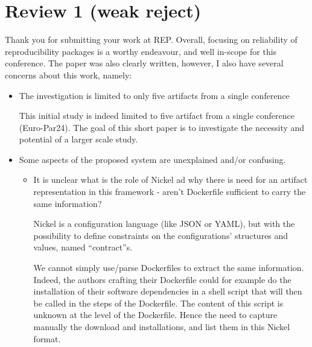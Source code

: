 \documentclass[%
	11pt,
	final,
]{article}
\begin{document}

\section{Review 1 (weak reject)}

Thank you for submitting your work at REP. Overall, focusing on reliability of reproducibility packages is a worthy endeavour, and well in-scope for this conference. The paper was also clearly written, however, I also have several concerns about this work, namely:


\begin{itemize}
\item The investigation is limited to only five artifacts from a single conference

\begin{review-answer}
  This initial study is indeed limited to five artifact from a single conference (Euro-Par24).
  The goal of this short paper is to investigate the necessity and potential of a larger scale study.
\end{review-answer}

\item Some aspects of the proposed system are unexplained and/or confusing.
  \begin{itemize}
   \item It is unclear what is the role of Nickel ad why there is need for an artifact representation in this framework - aren't Dockerfile sufficient to carry the same information?
\begin{review-answer}
  Nickel is a configuration language (like JSON or YAML), but with the possibility to define constraints on the configurations' structures and values, named ``contract''s.

  We cannot simply use/parse Dockerfiles to extract the same information.
  Indeed, the authors crafting their Dockerfile could for example do the installation of their software dependencies in a shell script that will then be called in the steps of the Dockerfile.
  The content of this script is unknown at the level of the Dockerfile.
  Hence the need to capture manually the download and installations, and list them in this Nickel format.
  

\end{review-answer}
\end{itemize}
\end{itemize}
\end{document}
